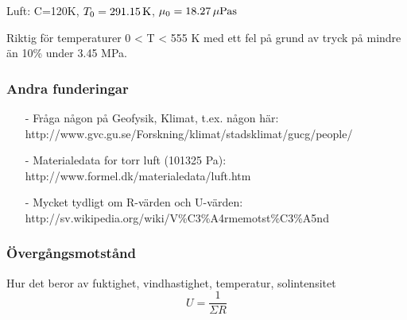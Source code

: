 Luft: C=120K, $T_0=\unit[291.15]{K}$, $\mu_0=\unit[18.27]{\mu Pa s}$

Riktig för temperaturer 0 < T < 555 K med ett fel på grund av tryck på mindre än 10\% under 3.45 MPa.



\subsubsection{Andra funderingar}
\begin{itemize}
\item[-] Fråga någon på Geofysik, Klimat, t.ex. någon här: \\
http://www.gvc.gu.se/Forskning/klimat/stadsklimat/gucg/people/
\item[-] Materialedata for torr luft (101325 Pa): http://www.formel.dk/materialedata/luft.htm
\item[-] Mycket tydligt om R-värden och U-värden: \\
http://sv.wikipedia.org/wiki/V\%C3\%A4rmemotst\%C3\%A5nd
\end{itemize}



\subsubsection{Övergångsmotstånd}
Hur det beror av fuktighet, vindhastighet, temperatur, solintensitet
\begin{equation}
U=\frac{1}{\Sigma R}
\end{equation}

